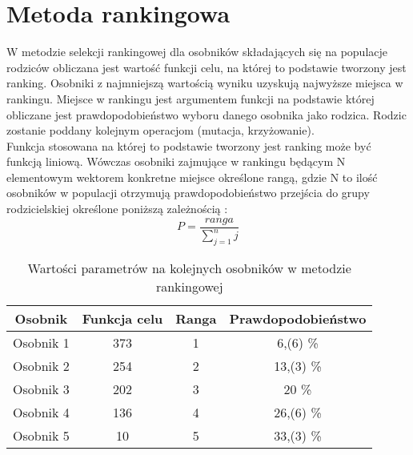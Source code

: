 
\section{Metoda rankingowa}\label{sec:kompilacja}


W metodzie selekcji rankingowej dla osobników składających się na populacje rodziców obliczana jest wartość funkcji celu, na której to podstawie tworzony jest ranking. Osobniki z najmniejszą wartością wyniku uzyskują najwyższe miejsca w rankingu. Miejsce w rankingu jest argumentem funkcji na podstawie której obliczane jest prawdopodobieństwo wyboru danego osobnika jako rodzica. Rodzic zostanie poddany kolejnym operacjom (mutacja, krzyżowanie).\\
 Funkcja stosowana na której to podstawie tworzony jest ranking może być funkcją liniową. Wówczas osobniki zajmujące w rankingu będącym N elementowym wektorem konkretne miejsce określone rangą, gdzie N to ilość osobników w populacji otrzymują prawdopodobieństwo przejścia do grupy rodzicielskiej określone poniższą zależnością \cite{Lam92}:
$$
P = \frac{ranga}{\sum_{j=1}^{n}j}
$$

\begin{table}[h!]
\begin{center}
\begin{tabular}{|c|c|c|c|}
\hline
\textbf{Osobnik}  & \textbf{Funkcja celu} & \textbf{Ranga} & \textbf{Prawdopodobieństwo}\\
\hline
Osobnik 1 & 373 & 1 & 6,(6) \% \\
\hline
Osobnik 2 &254 & 2  & 13,(3)  \% \\
\hline
Osobnik 3 & 202 & 3 & 20  \% \\
\hline
Osobnik 4 & 136 & 4 & 26,(6)  \% \\
\hline
Osobnik 5 & 10 & 5 & 33,(3)  \% \\
\hline
\end{tabular}
\caption{Wartości parametrów na kolejnych osobników w metodzie rankingowej}
\end{center}
\end{table}

\vspace{0,4cm}

